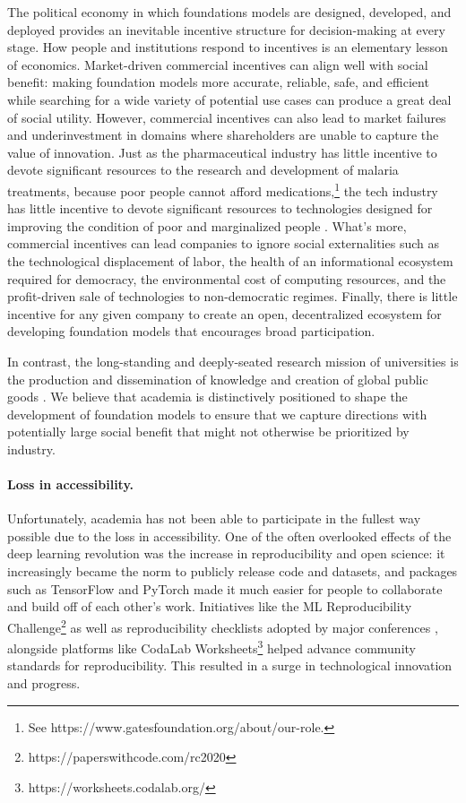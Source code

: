 The political economy in which foundations models are designed, developed, and deployed provides an inevitable incentive structure for decision-making at every stage. How people and institutions respond to incentives is an elementary lesson of economics. Market-driven commercial incentives can align well with social benefit: making foundation models more accurate, reliable, safe, and efficient while searching for a wide variety of potential use cases can produce a great deal of social utility. However, commercial incentives can also lead to market failures and underinvestment in domains where shareholders are unable to capture the value of innovation. Just as the pharmaceutical industry has little incentive to devote significant resources to the research and development of malaria treatments, because poor people cannot afford medications,\footnote{See https://www.gatesfoundation.org/about/our-role.} the tech industry has little incentive to devote significant resources to technologies designed for improving the condition of poor and marginalized people \citep{reich2021system}. What's more, commercial incentives can lead companies to ignore social externalities \citep{acemoglu2021redesigning, reich2021system} such as the technological displacement of labor, the health of an informational ecosystem required for democracy, the environmental cost of computing resources, and the profit-driven sale of technologies to non-democratic regimes. Finally, there is little incentive for any given company to create an open, decentralized ecosystem for developing foundation models that encourages broad participation.

In contrast, the long-standing and deeply-seated research mission of universities is the production and dissemination of knowledge and creation of global public goods \citep{kerr2001university,rhoten2011knowledge,nussbaum2010not}. We believe that academia is distinctively positioned to shape the development of foundation models to ensure that we capture directions with potentially large social benefit that might not otherwise be prioritized by industry.

\paragraph{Loss in accessibility.}

Unfortunately, academia has not been able to participate in the fullest way possible due to the loss in accessibility. One of the often overlooked effects of the deep learning revolution was the increase in reproducibility and open science: it increasingly became the norm to publicly release code and datasets, and packages such as TensorFlow \citep{abadi2016tensorflow} and PyTorch \citep{paszke2019pytorch} made it much easier for people to collaborate and build off of each other’s work. Initiatives like the ML Reproducibility
Challenge\footnote{https://paperswithcode.com/rc2020} as well as reproducibility checklists adopted by major conferences \citep{pineau2020improving}, alongside platforms like CodaLab 
Worksheets\footnote{https://worksheets.codalab.org/} helped advance community standards for reproducibility. This resulted in a surge in technological innovation and progress.

